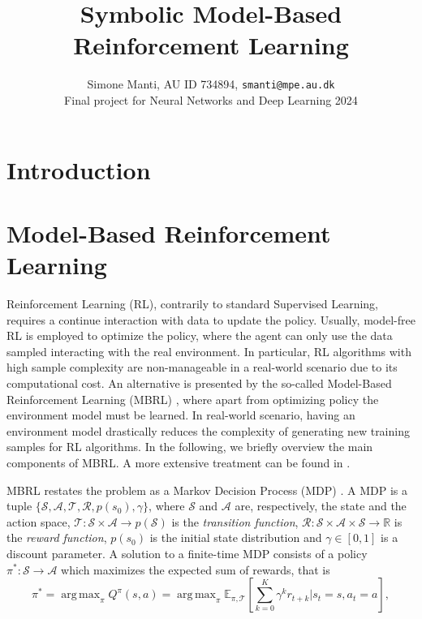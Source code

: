 \documentclass[11pt]{article}
\author{Simone Manti, AU ID 734894, \texttt{smanti@mpe.au.dk} \\
	Final project for Neural Networks and Deep Learning 2024}
\title{Symbolic Model-Based Reinforcement Learning}
\newcommand{\rr}{\mathbb{R}}
\DeclareMathOperator*{\argmax}{arg\,max}
\begin{document}
	\maketitle

\section{Introduction}

\section{Model-Based Reinforcement Learning}
Reinforcement Learning (RL), contrarily to standard Supervised Learning, requires a continue interaction with data to update the policy. Usually, model-free RL is employed to optimize the policy, where the agent can only use the data sampled interacting with the real environment. In particular, RL algorithms with high sample complexity are non-manageable in a real-world scenario due to its computational cost. An alternative is presented by the so-called Model-Based Reinforcement Learning (MBRL) \cite{moerland2023model}, where apart from optimizing policy the environment model must be learned. In real-world scenario, having an environment model drastically reduces the complexity of generating new training samples for RL algorithms.
In the following, we briefly overview the main components of MBRL. A more extensive treatment can be found in \cite{moerland2023model, pineda2021mbrl,luo2024survey}. 

MBRL restates the problem as a Markov Decision Process (MDP) \cite{puterman2014}. A MDP is a tuple $\{\mathcal{S}, \mathcal{A}, \mathcal{T}, \mathcal{R}, p(s_0), \gamma\}$, where $\mathcal{S}$ and $\mathcal{A}$ are, respectively, the state and the action space, $\mathcal{T}: \mathcal{S} \times \mathcal{A} \rightarrow p(\mathcal{S})$ is the \textsl{transition function}, $\mathcal{R}: \mathcal{S} \times \mathcal{A} \times \mathcal{S} \rightarrow \rr$ is the \textsl{reward function}, $p(s_0)$ is the initial state distribution and $\gamma \in [0,1]$ is a discount parameter.
A solution to a finite-time MDP consists of a policy $\pi^*: \mathcal{S} \rightarrow \mathcal{A}$ which maximizes the expected sum of rewards, that is
\begin{equation}
	\pi^* = \argmax_{\pi} Q^{\pi}(s,a) = \argmax_{\pi} \mathbb{E}_{\pi, \mathcal{T}}\left[\sum_{k=0}^K \gamma^k r_{t+k} | s_t = s, a_t = a \right], \label{eq: expected_sum_rewards}
\end{equation}
\end{document}
